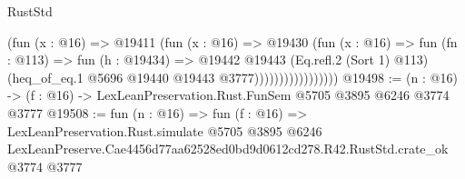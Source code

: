 \begin{lexlean}{RustStd}
\begin{coremodule}
                              (fun (x : @16) =>
                              @19411
                                (fun (x : @16) =>
                                @19430
                                  (fun (x : @16) =>
                                  fun (fn : @113) =>
                                  fun (h : @19434) =>
                                  @19442
                                    @19443
                                    (Eq.refl.{2} (Sort 1) @113)
                                    (heq_of_eq.{1} @5696 @19440 @19443 @3777)))))))))))))))))
@19498 := (n : @16) -> (f : @16) -> LexLeanPreservation.Rust.FunSem @5705 @3895 @6246 @3774 @3777
@19508 := fun (n : @16) =>
  fun (f : @16) =>
  LexLeanPreservation.Rust.simulate
    @5705
    @3895
    @6246
    LexLeanPreserve.Cae4456d77aa62528ed0bd9d0612cd278.R42.RustStd.crate_ok
    @3774
    @3777
\end{coremodule}
\end{lexlean}
